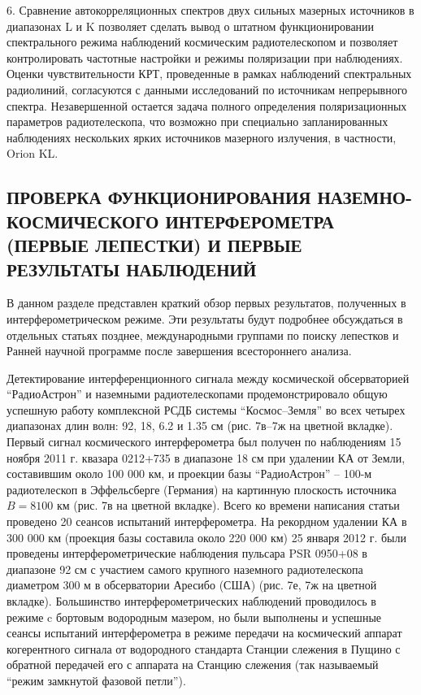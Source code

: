 6. Сравнение автокорреляционных спектров двух сильных мазерных источников в
диапазонах L и K позволяет сделать вывод о штатном функционировании спектрального
режима наблюдений космическим радиотелескопом и позволяет контролировать
частотные настройки и режимы поляризации при наблюдениях. Оценки чувствительности
КРТ, проведенные в рамках наблюдений спектральных радиолиний, согласуются
с данными исследований по источникам непрерывного спектра.
Незавершенной остается задача полного определения поляризационных параметров
радиотелескопа, что возможно при специально запланированных наблюдениях нескольких
ярких источников мазерного излучения, в частности, Orion KL.


\subsection{ПРОВЕРКА ФУНКЦИОНИРОВАНИЯ НАЗЕМНО-КОСМИЧЕСКОГО
         ИНТЕРФЕРОМЕТРА (ПЕРВЫЕ ЛЕПЕСТКИ) И ПЕРВЫЕ РЕЗУЛЬТАТЫ
         НАБЛЮДЕНИЙ}

В данном разделе представлен краткий обзор первых результатов,
полученных в интерферометрическом режиме. Эти результаты
будут подробнее обсуждаться в отдельных статьях позднее,
международными группами по поиску лепестков и Ранней научной
программе после завершения всестороннего анализа.

Детектирование интерференционного сигнала между космической обсерваторией
``РадиоАстрон''
и наземными радиотелескопами продемонстрировало общую успешную работу
комплексной РСДБ системы ``Космос--Земля'' во всех четырех диапазонах длин волн:
92, 18, 6.2 и 1.35 см (рис. 7в--7ж на цветной вкладке).
Первый сигнал космического
интерферометра был получен по наблюдениям 15 ноября 2011 г. квазара 0212+735 в
диапазоне 18 см при удалении КА от Земли, составившим около 100 000 км,
и проекции базы ``РадиоАстрон'' -- 100-м радиотелескоп в Эффельсберге
(Германия) на картинную плоскость источника $B = 8100$ км (рис. 7в на цветной вкладке).
Всего ко времени написания статьи проведено 20 сеансов испытаний интерферометра.
На рекордном удалении КА в 300 000 км (проекция базы составила
около 220 000 км) 25 января 2012 г. были проведены интерферометрические
наблюдения пульсара PSR 0950+08 в диапазоне 92 см с участием самого крупного
наземного радиотелескопа диаметром 300 м в обсерватории Аресибо (США) (рис. 7е, 7ж на цветной
вкладке).
Большинство
интерферометрических наблюдений проводилось в режиме c бортовым водородным
мазером, но были выполнены и успешные сеансы испытаний интерферометра в режиме
передачи на космический аппарат когерентного сигнала от водородного стандарта
Станции слежения в Пущино с обратной передачей его с аппарата на Станцию слежения
(так называемый ``режим замкнутой фазовой петли'').

